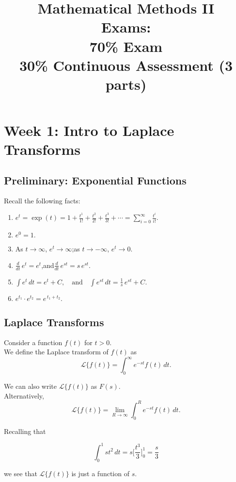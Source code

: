 \documentclass[12pt]{article}
\title{
Mathematical Methods II\\[2ex]
Exams:\\
70\% Exam\\
30\% Continuous Assessment (3 parts)
}
\author{}     %
\date{}       %
\theoremstyle{definition}
\theoremstyle{plain}
\begin{document}
\maketitle
\pagebreak

\tableofcontents
\pagebreak

\section{Week 1: Intro to Laplace Transforms}
\subsection{Preliminary: Exponential Functions}
Recall the following facts:
\begin{enumerate}
    \item \( e^t = \exp(t) = 1 + \frac{t^1}{1!} + \frac{t^2}{2!} + \frac{t^3}{3!} + \cdots 
           = \sum_{i=0}^\infty \frac{t^i}{i!}.\)
    \item \( e^0 = 1.\)
    \item As \( t \to \infty \), \( e^t \to \infty \);\quad as \( t \to -\infty \), \( e^t \to 0.\)
    \item \(\frac{d}{dt}\, e^t = e^t\),\quad and\quad \(\frac{d}{dt}\, e^{st} = s\, e^{st}.\)
    \item \(\displaystyle \int e^t\, dt = e^t + C,\quad \text{and} \quad
           \int e^{st}\, dt = \frac{1}{s}\, e^{st} + C.\)
    \item \( e^{t_1} \cdot e^{t_2} = e^{\,t_1 + t_2}.\)
\end{enumerate}


\subsection{Laplace Transforms}

\begin{definitionbox}
Consider a function \(f(t)\) for \(t > 0\).\\[1ex]
We define the Laplace transform of \(f(t)\) as
\[
\mathcal{L}\{f(t)\} = \int_0^\infty e^{-st} f(t) \, dt.
\]
\end{definitionbox}

\begin{notebox}
We can also write \( \mathcal{L}\{f(t)\} \) as \( F(s) \).\\[1ex]
Alternatively,
\[
\mathcal{L}\{f(t)\} = \lim_{R \to \infty} \int_0^R e^{-st} f(t) \, dt.
\]
\end{notebox}

\noindent Recalling that

$$\int_0^1 s t^2 \, dt = s\Big[\frac{t^3}{3}\Big]_0^1 = \frac{s}{3}$$
                     
\noindent we see that \( \mathcal{L}\{f(t)\} \) is just a function of \( s \).



\pagebreak
\end{document}
